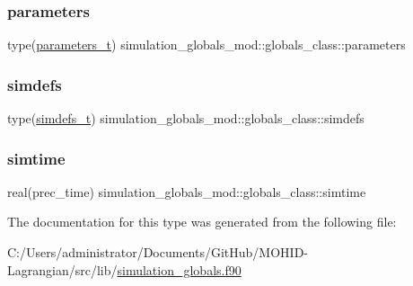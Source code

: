 \subsubsection{\texorpdfstring{parameters}{parameters}}
{\footnotesize\ttfamily type(\hyperlink{structsimulation__globals__mod_1_1parameters__t}{parameters\+\_\+t}) simulation\+\_\+globals\+\_\+mod\+::globals\+\_\+class\+::parameters\hspace{0.3cm}{\ttfamily [private]}}

\mbox{\label{structsimulation__globals__mod_1_1globals__class_aa066434c9dc6147331dce613422568ae}} 
\subsubsection{\texorpdfstring{simdefs}{simdefs}}
{\footnotesize\ttfamily type(\hyperlink{structsimulation__globals__mod_1_1simdefs__t}{simdefs\+\_\+t}) simulation\+\_\+globals\+\_\+mod\+::globals\+\_\+class\+::simdefs\hspace{0.3cm}{\ttfamily [private]}}

\mbox{\label{structsimulation__globals__mod_1_1globals__class_ab28ea8e0cca87c11a33e4acfb3d3b293}} 
\subsubsection{\texorpdfstring{simtime}{simtime}}
{\footnotesize\ttfamily real(prec\+\_\+time) simulation\+\_\+globals\+\_\+mod\+::globals\+\_\+class\+::simtime\hspace{0.3cm}{\ttfamily [private]}}



The documentation for this type was generated from the following file\+:\begin{DoxyCompactItemize}
\item 
C\+:/\+Users/administrator/\+Documents/\+Git\+Hub/\+M\+O\+H\+I\+D-\/\+Lagrangian/src/lib/\hyperlink{simulation__globals_8f90}{simulation\+\_\+globals.\+f90}\end{DoxyCompactItemize}
